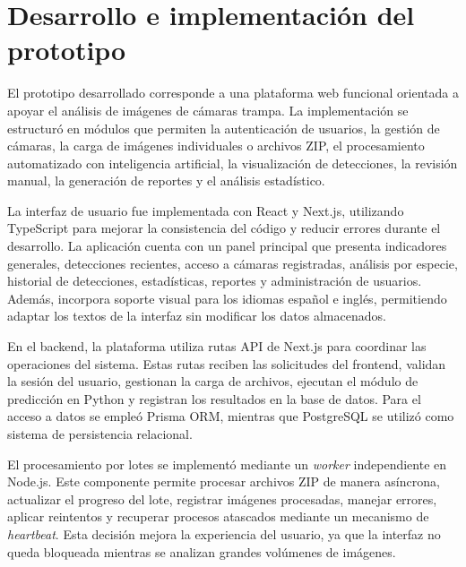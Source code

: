 \section{Desarrollo e implementación del prototipo}
\label{sec:desarrollo_implementacion_prototipo}

El prototipo desarrollado corresponde a una plataforma web funcional orientada a apoyar el análisis de imágenes de cámaras trampa. La implementación se estructuró en módulos que permiten la autenticación de usuarios, la gestión de cámaras, la carga de imágenes individuales o archivos ZIP, el procesamiento automatizado con inteligencia artificial, la visualización de detecciones, la revisión manual, la generación de reportes y el análisis estadístico.

La interfaz de usuario fue implementada con React y Next.js, utilizando TypeScript para mejorar la consistencia del código y reducir errores durante el desarrollo. La aplicación cuenta con un panel principal que presenta indicadores generales, detecciones recientes, acceso a cámaras registradas, análisis por especie, historial de detecciones, estadísticas, reportes y administración de usuarios. Además, incorpora soporte visual para los idiomas español e inglés, permitiendo adaptar los textos de la interfaz sin modificar los datos almacenados.

En el backend, la plataforma utiliza rutas API de Next.js para coordinar las operaciones del sistema. Estas rutas reciben las solicitudes del frontend, validan la sesión del usuario, gestionan la carga de archivos, ejecutan el módulo de predicción en Python y registran los resultados en la base de datos. Para el acceso a datos se empleó Prisma ORM, mientras que PostgreSQL se utilizó como sistema de persistencia relacional.

El procesamiento por lotes se implementó mediante un \textit{worker} independiente en Node.js. Este componente permite procesar archivos ZIP de manera asíncrona, actualizar el progreso del lote, registrar imágenes procesadas, manejar errores, aplicar reintentos y recuperar procesos atascados mediante un mecanismo de \textit{heartbeat}. Esta decisión mejora la experiencia del usuario, ya que la interfaz no queda bloqueada mientras se analizan grandes volúmenes de imágenes.

